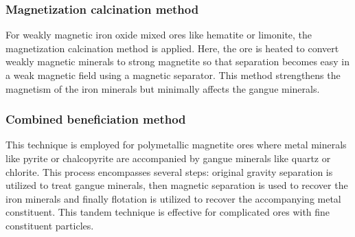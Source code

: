 \documentclass[12pt,a4paper, top=1.9cm, bottom=2.03cm, left=3.81cm, right=1.9cm]{article}
\begin{document}
\subsubsection{Magnetization calcination method}
\noindent\fontsize{12}{14}\selectfont For weakly magnetic iron oxide mixed ores like hematite or limonite, the magnetization calcination method is applied. Here, the ore is heated to convert weakly magnetic minerals to strong magnetite so that separation becomes easy in a weak magnetic field using a magnetic separator. This method strengthens the magnetism of the iron minerals but minimally affects the gangue minerals.
\subsubsection{Combined beneficiation method}
\noindent\fontsize{12}{14}\selectfont This technique is employed for polymetallic magnetite ores where metal minerals like pyrite or chalcopyrite are accompanied by gangue minerals like quartz or chlorite. This process encompasses several steps: original gravity separation is utilized to treat gangue minerals, then magnetic separation is used to recover the iron minerals and finally flotation is utilized to recover the accompanying metal constituent. This tandem technique is effective for complicated ores with fine constituent particles.
\end{document}
